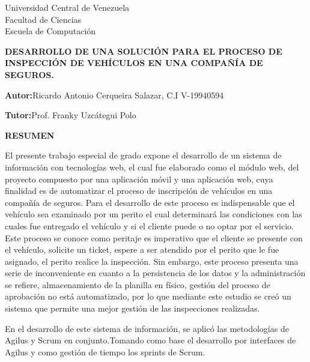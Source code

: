 
\begin{center}
	Universidad Central de Venezuela\\
	Facultad de Ciencias\\
	Escuela de Computación\\
	
\end{center}

\begin{center}
	\textbf{ DESARROLLO DE UNA SOLUCIÓN PARA EL PROCESO DE INSPECCIÓN DE VEHÍCULOS EN UNA COMPAÑÍA DE SEGUROS. }
\end{center}

\begin{flushright}
\textbf{Autor:}Ricardo Antonio Cerqueira Salazar, C.I V-19940594
\end{flushright}

\begin{flushright}
\textbf{Tutor:}Prof. Franky Uzcátegui Polo
\end{flushright}


\begin{center}
	\large{\textbf{RESUMEN}}
\end{center}

\justify

El presente trabajo especial de grado expone el desarrollo de un sistema de información con tecnologías web, el cual fue elaborado como el módulo web, del proyecto compuesto por una aplicación móvil y una aplicación web, cuya finalidad es de automatizar el proceso de inscripción de vehículos en una compañía de seguros. Para el desarrollo de este proceso es indispensable que el vehículo sea examinado por un perito el cual determinará las condiciones con las cuales fue entregado el vehículo y si el cliente puede o no optar por el servicio. Este proceso se conoce como peritaje es imperativo que el cliente se presente con el vehículo, solicite un ticket, espere a ser atendido por el perito que le fue asignado, el perito realice la inspección. Sin embargo, este proceso presenta una serie de inconveniente en cuanto a la persistencia de los datos y la administración se refiere, almacenamiento de la planilla en físico, gestión del proceso de aprobación no está automatizado, por lo que mediante este estudio se creó un sistema que permite una mejor gestión de las inspecciones realizadas.

En el desarrollo de este sistema de información, se aplicó las metodologías de Agilus y Scrum en conjunto.Tomando como base el desarrollo por interfaces de Agilus y como gestión de tiempo los sprints de Scrum.

